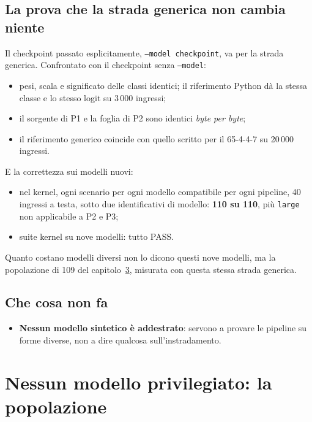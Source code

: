 \documentclass[11pt,a4paper,oneside]{report}
\begin{document}
\section{La prova che la strada generica non cambia niente}
\label{sec:stradanuova}

Il checkpoint passato esplicitamente, \texttt{--model checkpoint}, va per la
strada generica. Confrontato con il checkpoint senza \texttt{--model}:
\begin{itemize}
  \item pesi, scala e significato delle classi identici; il riferimento Python
        dà la stessa classe e lo stesso logit su 3\,000 ingressi;
  \item il sorgente di P1 e la foglia di P2 sono identici \emph{byte per byte};
  \item il riferimento generico coincide con quello scritto per il 65-4-4-7 su
        20\,000 ingressi.
\end{itemize}

E la correttezza sui modelli nuovi:
\begin{itemize}
  \item nel kernel, ogni scenario per ogni modello compatibile per ogni pipeline,
        40 ingressi a testa, sotto due identificativi di modello:
        \textbf{110 su 110}, più \texttt{large} non applicabile a P2 e P3;
  \item suite kernel su nove modelli: tutto PASS.
\end{itemize}

Quanto costano modelli diversi non lo dicono questi nove modelli, ma la
popolazione di 109 del capitolo~\ref{ch:popolazione}, misurata con questa stessa
strada generica.

\section{Che cosa non fa}

\begin{itemize}
  \item \textbf{Nessun modello sintetico è addestrato}: servono a provare le
        pipeline su forme diverse, non a dire qualcosa sull'instradamento.
\end{itemize}

\chapter{Nessun modello privilegiato: la popolazione}
\label{ch:popolazione}
\end{document}
